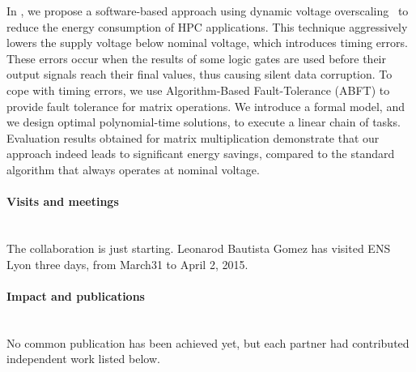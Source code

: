 \begin{refsection}
In \cite{Cavelan15_timing}, we propose a software-based approach using dynamic voltage 
overscaling~\cite{Ciocca04_ALFT}
to reduce the energy consumption of HPC applications. This technique
aggressively lowers the supply voltage below nominal voltage, which
introduces timing errors. These errors occur when the results of some logic gates are used before their output signals
reach their final values, thus causing silent data corruption. To cope with timing errors, we use Algorithm-Based Fault-Tolerance
(ABFT) to provide fault tolerance for matrix operations. We introduce
a formal model, and we design optimal polynomial-time solutions, to execute a linear chain of tasks. Evaluation results obtained for matrix multiplication demonstrate that our approach indeed leads to significant energy savings, compared to the standard algorithm that always operates at nominal voltage.

\paragraph{Visits and meetings}~\\

The collaboration is just starting. Leonarod Bautista Gomez has visited
ENS Lyon three days, from March31 to April 2, 2015.

%
%

\paragraph{Impact and publications}~\\

No common publication has been achieved yet, but each partner had contributed independent work listed 
below.\\

\printbibliography[heading=none,keyword=own]




\end{refsection}
